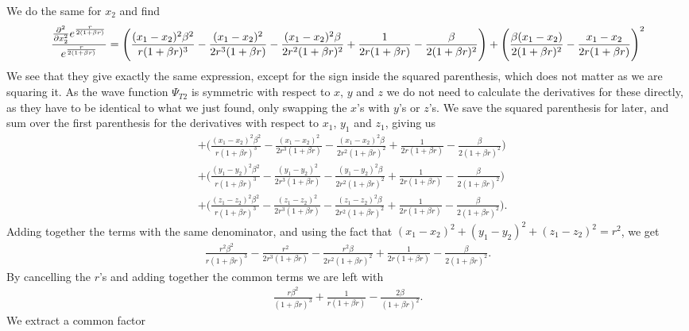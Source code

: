 \documentclass[%
 reprint,
nofootinbib,
aps,
]{revtex4-1}
\begin{document}
\endgroup
We do the same for $x_2$ and find
\begingroup\makeatletter\def\f@size{8.5}\check@mathfonts
\begin{gather}
  \frac{\pdv[2]{}{x_2}e^{\frac{r}{2( 1 + \beta r)}}}{e^{\frac{r}{2( 1 + \beta r)}}} =
  \Bigg( \frac{(x_1-x_2)^2\beta^2}{r(1+\beta r)^3} - \frac{(x_1-x_2)^2}{2r^3(1+\beta r)} - \frac{(x_1-x_2)^2\beta}{2r^2(1+\beta r)^2} +\frac{1}{2r(1+\beta r)}-\frac{\beta}{2(1+\beta r)^2}\Bigg) +\Bigg(\frac{\beta(x_1-x_2)}{2(1+\beta r)^2} - \frac{x_1-x_2}{2r(1+\beta r)} \Bigg)^2
\end{gather}
\endgroup
We see that they give exactly the same expression, except for the sign inside the squared parenthesis, which does not matter as we are squaring it. As the wave function $\Psi_{T2}$ is symmetric with respect to $x$, $y$ and $z$ we do not need to calculate the derivatives for these directly, as they have to be identical to what we just found, only swapping the $x$'s with $y$'s or $z$'s. We save the squared parenthesis for later, and sum over the first parenthesis for the derivatives with respect to $x_1$, $y_1$ and $z_1$, giving us
\begin{align}
  &+ \Bigg( \frac{(x_1-x_2)^2\beta^2}{r(1+\beta r)^3} - \frac{(x_1-x_2)^2}{2r^3(1+\beta r)} - \frac{(x_1-x_2)^2\beta}{2r^2(1+\beta r)^2}  +\frac{1}{2r(1+\beta r)}-\frac{\beta}{2(1+\beta r)^2}\Bigg) \nonumber \\
   &+ \Bigg( \frac{(y_1-y_2)^2\beta^2}{r(1+\beta r)^3} - \frac{(y_1-y_2)^2}{2r^3(1+\beta r)} - \frac{(y_1-y_2)^2\beta}{2r^2(1+\beta r)^2} +\frac{1}{2r(1+\beta r)}-\frac{\beta}{2(1+\beta r)^2}\Bigg)\\
   &+\Bigg( \frac{(z_1-z_2)^2\beta^2}{r(1+\beta r)^3} - \frac{(z_1-z_2)^2}{2r^3(1+\beta r)} - \frac{(z_1-z_2)^2\beta}{2r^2(1+\beta r)^2} +\frac{1}{2r(1+\beta r)}-\frac{\beta}{2(1+\beta r)^2}\Bigg). \nonumber
\end{align}
Adding together the terms with the same denominator, and using the fact that $(x_1-x_2)^2+(y_1-y_2)^2+(z_1-z_2)^2=r^2$, we get
\begin{gather}
  \frac{r^2\beta^2}{r(1+\beta r)^3} - \frac{r^2}{2r^3(1+\beta r)} - \frac{r^2\beta}{2r^2(1+\beta r)^2} +\frac{1}{2r(1+\beta r)}-\frac{\beta}{2(1+\beta r)^2}.
\end{gather}
By cancelling the $r$'s and adding together the common terms we are left with
\begin{gather}
  \frac{r\beta^2}{(1+\beta r)^3} + \frac{1}{r(1+\beta r)} - \frac{2\beta}{(1+\beta r)^2}.
\end{gather}
We extract a common factor
\end{document}
